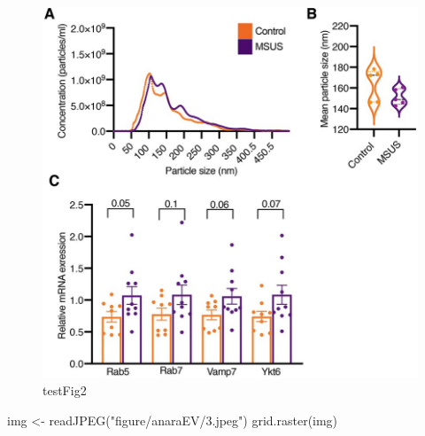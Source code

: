 \documentclass[12pt,twoside]{reedthesis}
\newenvironment{Shaded}{\begin{snugshade}}{\end{snugshade}}
\newcommand{\FunctionTok}[1]{\textcolor[rgb]{0.00,0.00,0.00}{#1}}
\newcommand{\NormalTok}[1]{#1}
\newcommand{\OtherTok}[1]{\textcolor[rgb]{0.56,0.35,0.01}{#1}}
\newcommand{\StringTok}[1]{\textcolor[rgb]{0.31,0.60,0.02}{#1}}
\begin{document}
\begin{figure}

{\centering \includegraphics{thesis_files/figure-latex/fig2-1} 

}

\caption{testFig2}\label{fig:fig2}
\end{figure}
\begin{Shaded}
\begin{Highlighting}[]
\NormalTok{img }\OtherTok{\textless{}{-}} \FunctionTok{readJPEG}\NormalTok{(}\StringTok{"figure/anaraEV/3.jpeg"}\NormalTok{)}
\FunctionTok{grid.raster}\NormalTok{(img)}
\end{Highlighting}
\end{Shaded}
\end{document}

